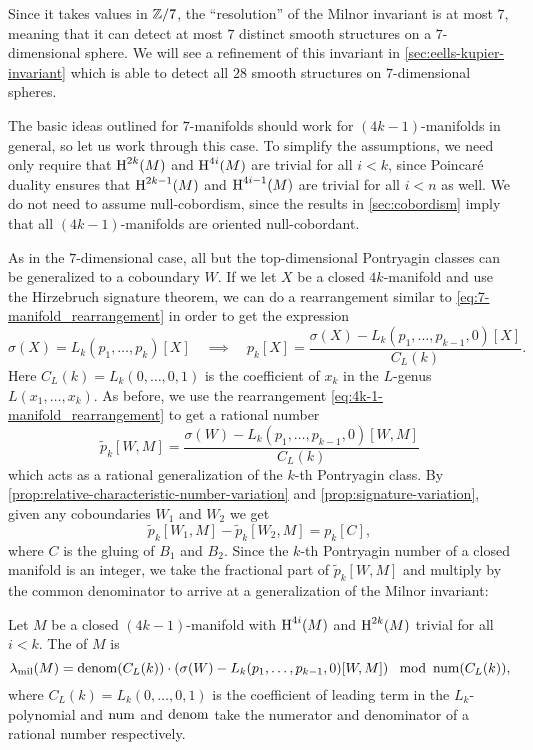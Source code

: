 \begin{remark*}
	Since it takes values in $\mathbb{Z}/7$, the ``resolution'' of the Milnor invariant is at most $7$, meaning that it can detect at most $7$ distinct smooth structures on a $7$-dimensional sphere. We will see a refinement of this invariant in \cref{sec:eells-kupier-invariant} which is able to detect all $28$ smooth structures on $7$-dimensional spheres.
\end{remark*}

The basic ideas outlined for $7$-manifolds should work for $(4k-1)$-manifolds in general, so let us work through this case. To simplify the assumptions, we need only require that $\operatorname{H}^{2k}(M)$ and $\operatorname{H}^{4i}(M)$ are trivial for all $i<k$, since Poincar\'e duality ensures that $\operatorname{H}^{2k-1}(M)$ and $\operatorname{H}^{4i-1}(M)$ are trivial for all $i<n$ as well. We do not need to assume null-cobordism, since the results in \cref{sec:cobordism} imply that all $(4k-1)$-manifolds are oriented null-cobordant.

As in the $7$-dimensional case, all but the top-dimensional Pontryagin classes can be generalized to a coboundary $W$.
If we let $X$ be a closed $4k$-manifold and use the Hirzebruch signature theorem, we can do a rearrangement similar to \cref{eq:7-manifold_rearrangement} in order to get the expression
\begin{equation}\label{eq:4k-1-manifold_rearrangement}
	\sigma(X) = L_k(p_1, \ldots, p_k)[X]\quad\implies\quad
	p_k[X] = \frac{\sigma(X) - L_k(p_1,\ldots, p_{k-1}, 0)[X]}{C_L(k)}.
\end{equation}
Here $C_L(k)=L_k(0,\ldots, 0, 1)$ is the coefficient of $x_k$ in the $L$-genus $L(x_1,\ldots, x_k)$.
As before, we use the rearrangement \cref{eq:4k-1-manifold_rearrangement} to get a rational number
\[
\widetilde{p}_k[W, M] = \frac{\sigma(W) - L_k(p_1,\ldots, p_{k-1}, 0)[W,M]}{C_L(k)}
\]
which acts as a rational generalization of the $k$-th Pontryagin class. By \cref{prop:relative-characteristic-number-variation} and \cref{prop:signature-variation}, given any coboundaries $W_1$ and $W_2$ we get
\[
\widetilde{p}_k[W_1, M] - \widetilde{p}_k[W_2, M] = p_k[C],
\]
where $C$ is the gluing of $B_1$ and $B_2$. Since the $k$-th Pontryagin number of a closed manifold is an integer, we take the fractional part of $\widetilde{p}_k[W,M]$ and multiply by the common denominator to arrive at a generalization of the Milnor invariant:

\begin{definition}
	Let $M$ be a closed $(4k-1)$-manifold with $\operatorname{H}^{4i}(M)$ and $\operatorname{H}^{2k}(M)$ trivial for all $i<k$. The  of $M$ is
	\[
		\lambda_{\mathrm{mil}}(M) = \operatorname{denom}(C_L(k))\cdot \left(\sigma(W) - L_k(p_1, \ldots, p_{k-1},0)[W,M]\right)\mod {\operatorname{num}}(C_L(k)),
	\]
	where $C_L(k) = L_k(0,\ldots,0,1)$ is the coefficient of leading term in the $L_k$-polynomial and $\operatorname{num}$ and $\operatorname{denom}$ take the numerator and denominator of a rational number respectively.
\end{definition}

